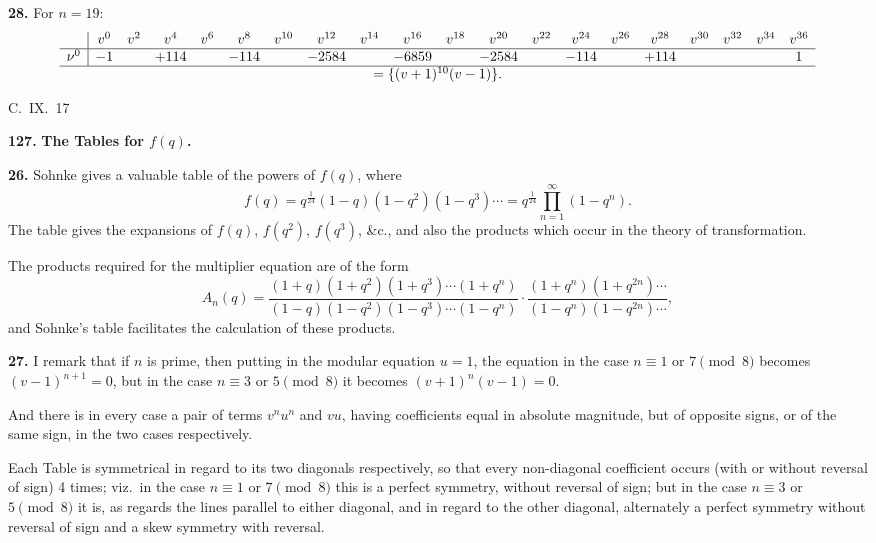 \documentclass[11pt,a4paper]{article}
\theoremstyle{plain}
\begin{document}
\medskip
\noindent\textbf{28.} For $n = 19$:
\[
\begin{array}{r|ccccccccccccccccccc}
& v^0 & v^2 & v^4 & v^6 & v^8 & v^{10} & v^{12} & v^{14} & v^{16} & v^{18} & v^{20} & v^{22} & v^{24} & v^{26} & v^{28} & v^{30} & v^{32} & v^{34} & v^{36} \\
\hline
\nu^0 & -1 & & +114 & & -114 & & -2584 & & -6859 & & -2584 & & -114 & & +114 & & & & 1 \\
\hline
\multicolumn{20}{c}{= \{(v + 1)^{10}(v - 1)\}.}
\end{array}
\]

\begin{flushright}
C.~IX.~17
\end{flushright}


\noindent\textbf{127.} \textbf{The Tables for $f(q)$.}

\medskip
\noindent\textbf{26.} Sohnke gives a valuable table of the powers of $f(q)$, where
\[
f(q) = q^{\frac{1}{24}}(1 - q)(1 - q^2)(1 - q^3)\cdots = q^{\frac{1}{24}}\prod_{n=1}^{\infty}(1 - q^n).
\]
The table gives the expansions of $f(q)$, $f(q^2)$, $f(q^3)$, \&c., and also the products which occur in the theory of transformation.

The products required for the multiplier equation are of the form
\[
A_n(q) = \frac{(1 + q)(1 + q^2)(1 + q^3)\cdots(1 + q^n)}{(1 - q)(1 - q^2)(1 - q^3)\cdots(1 - q^n)} \cdot \frac{(1 + q^n)(1 + q^{2n})\cdots}{(1 - q^n)(1 - q^{2n})\cdots},
\]
and Sohnke's table facilitates the calculation of these products.

\medskip
\noindent\textbf{27.} I remark that if $n$ is prime, then putting in the modular equation $u = 1$, the equation in the case $n \equiv 1$ or $7 \pmod{8}$ becomes $(v - 1)^{n+1} = 0$, but in the case $n \equiv 3$ or $5 \pmod{8}$ it becomes $(v + 1)^n(v - 1) = 0$.

And there is in every case a pair of terms $v^n u^n$ and $vu$, having coefficients equal in absolute magnitude, but of opposite signs, or of the same sign, in the two cases respectively.

Each Table is symmetrical in regard to its two diagonals respectively, so that every non-diagonal coefficient occurs (with or without reversal of sign) 4 times; viz.\ in the case $n \equiv 1$ or $7 \pmod{8}$ this is a perfect symmetry, without reversal of sign; but in the case $n \equiv 3$ or $5 \pmod{8}$ it is, as regards the lines parallel to either diagonal, and in regard to the other diagonal, alternately a perfect symmetry without reversal of sign and a skew symmetry with reversal.
\end{document}
